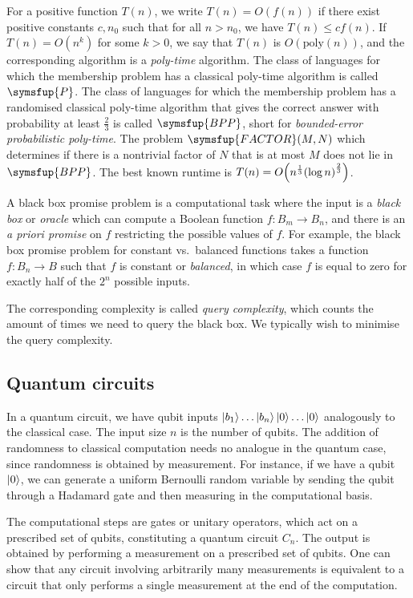 For a positive function \( T(n) \), we write \( T(n) = O(f(n)) \) if there exist positive constants \( c, n_0 \) such that for all \( n > n_0 \), we have \( T(n) \leq cf(n) \).
If \( T(n) = O(n^k) \) for some \( k > 0 \), we say that \( T(n) \) is \( O(\mathrm{poly}(n)) \), and the corresponding algorithm is a \emph{poly-time} algorithm.
The class of languages for which the membership problem has a classical poly-time algorithm is called \( \symsfup{P} \).
The class of languages for which the membership problem has a randomised classical poly-time algorithm that gives the correct answer with probability at least \( \frac{2}{3} \) is called \( \symsfup{BPP} \), short for \emph{bounded-error probabilistic poly-time}.
The problem \( \symsfup{FACTOR}(M,N) \) which determines if there is a nontrivial factor of \( N \) that is at most \( M \) does not lie in \( \symsfup{BPP} \).
The best known runtime is \( T(n) = O\qty(n^{\frac{1}{3}}\qty(\log n)^\frac{2}{3}) \).

A black box promise problem is a computational task where the input is a \emph{black box} or \emph{oracle} which can compute a Boolean function \( f \colon B_m \to B_n \), and there is an \emph{a priori promise} on \( f \) restricting the possible values of \( f \).
For example, the black box promise problem for constant vs.\ balanced functions takes a function \( f \colon B_n \to B \) such that \( f \) is constant or \emph{balanced}, in which case \( f \) is equal to zero for exactly half of the \( 2^n \) possible inputs.

The corresponding complexity is called \emph{query complexity}, which counts the amount of times we need to query the black box.
We typically wish to minimise the query complexity.

\subsection{Quantum circuits}
In a quantum circuit, we have qubit inputs \( \ket{b_1} \dots \ket{b_n} \ket{0} \dots \ket{0} \) analogously to the classical case.
The input size \( n \) is the number of qubits.
The addition of randomness to classical computation needs no analogue in the quantum case, since randomness is obtained by measurement.
For instance, if we have a qubit \( \ket{0} \), we can generate a uniform Bernoulli random variable by sending the qubit through a Hadamard gate and then measuring in the computational basis.

The computational steps are gates or unitary operators, which act on a prescribed set of qubits, constituting a quantum circuit \( C_n \).
The output is obtained by performing a measurement on a prescribed set of qubits.
One can show that any circuit involving arbitrarily many measurements is equivalent to a circuit that only performs a single measurement at the end of the computation.

